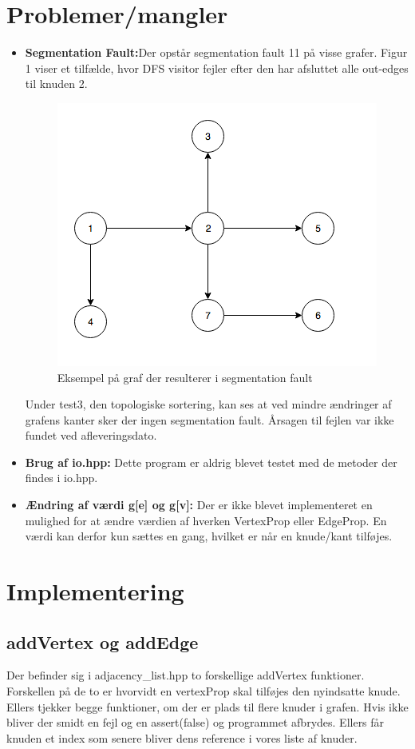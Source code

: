 \documentclass[a4paper,10pt,titlepage]{article}
\begin{document}
\section{Problemer/mangler}
\begin{itemize}
\item
\textbf{Segmentation Fault:}Der opstår segmentation fault 11 på visse grafer. Figur 1 viser et tilfælde, hvor DFS visitor fejler efter den har afsluttet alle out-edges til knuden 2.
\begin{figure}[H]
\centering
\includegraphics[scale=0.5]{Billeder/SegFaultGraph.png}
\caption{Eksempel på graf der resulterer i segmentation fault}
\end{figure}
Under test3, den topologiske sortering, kan ses at ved mindre ændringer af grafens kanter sker der ingen segmentation fault. Årsagen til fejlen var ikke fundet ved afleveringsdato.
\item
\textbf{Brug af io.hpp:} Dette program er aldrig blevet testet med de metoder der findes i io.hpp.   
\item
\textbf{Ændring af værdi g[e] og g[v]:} Der er ikke blevet implementeret en mulighed for at ændre værdien af hverken VertexProp eller EdgeProp. En værdi kan derfor kun sættes en gang, hvilket er når en knude/kant tilføjes.
\end{itemize}

\section{Implementering}
\subsection{addVertex og addEdge}
Der befinder sig i adjacency\_list.hpp to forskellige addVertex funktioner. Forskellen på de to er hvorvidt en vertexProp skal tilføjes den nyindsatte knude. Ellers tjekker begge funktioner, om der er plads til flere knuder i grafen. Hvis ikke bliver der smidt en fejl og en assert(false) og programmet afbrydes. Ellers får knuden et index som senere bliver dens reference i vores liste af knuder. \\
\end{document}
